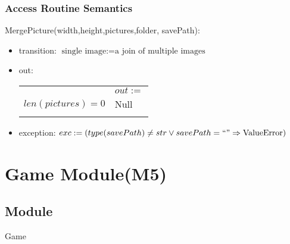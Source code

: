 \documentclass{article}
\begin{document}
\subsubsection {Access Routine Semantics}
\noindent MergePicture(width,height,pictures,folder, savePath):
\begin{itemize}
\item transition: $\text{single image} := \text{a join of multiple images}$ 

\item out: 

\begin{tabular}{|p{3cm}|l|}
\hhline{~|-|}
\multicolumn{1}{r|}{} & \multicolumn{1}{l|}{$out :=$}\\
\hhline{|-|-|}
$len(pictures) = 0$ & Null \\
\hhline{|-|-|}
\end{tabular}

\item exception: $exc := (type(savePath) \neq str \lor savePath = ``" \Rightarrow \text{ValueError})$
\end{itemize}\vspace{6mm}

\newpage


\section {Game Module(M5)}

\subsection{Module}
Game
\end{document}
